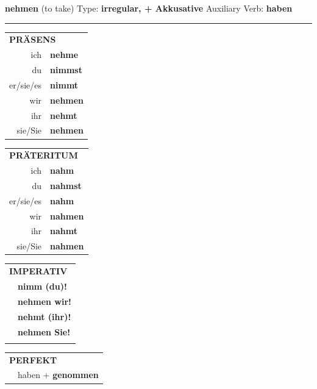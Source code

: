 \documentclass[10pt,a4paper]{revtex4-2}
\begin{document}
\begin{verbbox-acc}
    {\Large \bf nehmen} (to take) \hfill Type: \textbf{irregular, + Akkusative} \hfill Auxiliary Verb: \textbf{haben} 
    
     \vspace{5pt}

    \hrule
    
    \vspace{5pt}

  \begin{tabular}{rl}
     \multicolumn{2}{l}{\textbf{PRÄSENS} }\\
    ich & \textbf{nehme}\\
    du & \textbf{nimmst}\\
    er/sie/es & \textbf{nimmt}\\
    wir & \textbf{nehmen}\\
    ihr & \textbf{nehmt}\\
    sie/Sie & \textbf{nehmen}\\
  \end{tabular}
  \hfill
     \begin{tabular}{rl}
    \multicolumn{2}{l}{\textbf{PRÄTERITUM} }\\
    ich & \textbf{nahm}\\
    du & \textbf{nahmst}\\
    er/sie/es & \textbf{nahm}\\
    wir & \textbf{nahmen}\\
    ihr & \textbf{nahmt}\\
    sie/Sie & \textbf{nahmen}\\
  \end{tabular}
  \hfill
  \begin{tabular}{rl}
     \multicolumn{2}{l}{\textbf{IMPERATIV} }\\
   & \textbf{nimm (du)!}\\
   & \textbf{nehmen wir!}\\
   & \textbf{nehmt (ihr)!}\\
   & \textbf{nehmen Sie!}\\
   & \vspace{10pt}
  \end{tabular}

    \vspace{10pt}

 \begin{tabular}{rl}
     \multicolumn{2}{l}{\textbf{PERFEKT}}\\
  &  haben + \textbf{genommen}\\
  \end{tabular}
\hfill
   \begin{tabular}{rl}
   

\end{tabular}
\end{verbbox-acc}
\end{document}
